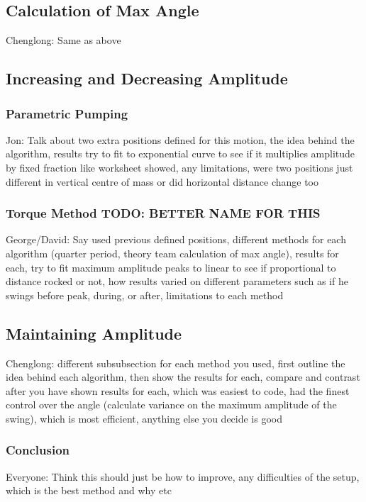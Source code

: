 \documentclass[11pt]{article}
\begin{document}
\subsection{Calculation of Max Angle}
Chenglong: Same as above

\subsection{Increasing and Decreasing Amplitude}


\subsubsection{Parametric Pumping}
Jon: Talk about two extra positions defined for this motion, the idea behind the algorithm, results try to fit to exponential curve to see if it multiplies amplitude by fixed fraction like worksheet showed, any limitations, were two positions just different in vertical centre of mass or did horizontal distance change too
\subsubsection{Torque Method TODO: BETTER NAME FOR THIS}
George/David: Say used previous defined positions, different methods for each algorithm (quarter period, theory team calculation of max angle), results for each, try to fit maximum amplitude peaks to linear to see if proportional to distance rocked or not, how results varied on different parameters such as if he swings before peak, during, or after, limitations to each method

\subsection{Maintaining Amplitude}
Chenglong: different subsubsection for each method you used, first outline the idea behind each algorithm, then show the results for each, compare and contrast after you have shown results for each, which was easiest to code, had the finest control over the angle (calculate variance on the maximum amplitude of the swing), which is most efficient, anything else you decide is good

\subsubsection{Conclusion}
Everyone: Think this should just be how to improve, any difficulties of the setup, which is the best method and why etc
\end{document}
